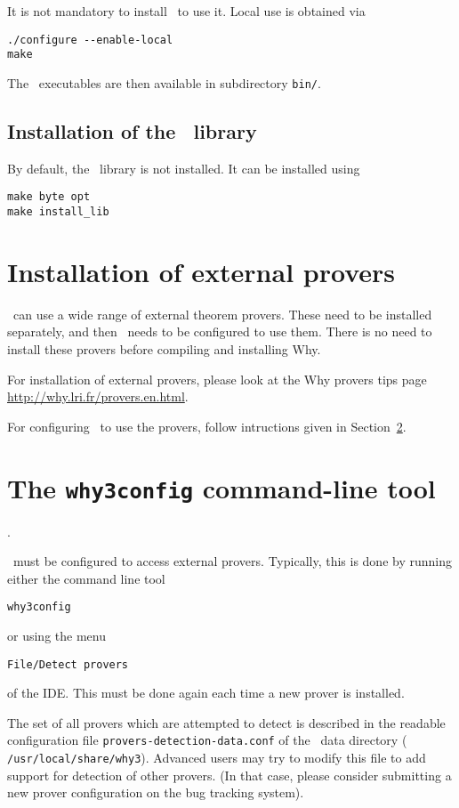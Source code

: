 It is not mandatory to install \why\ to use it. Local use is obtained via
\begin{verbatim}
./configure --enable-local
make
\end{verbatim}
The \why\ executables are then available in subdirectory \texttt{bin/}.

\subsection{Installation of the \why\ library}
\label{sec:installlib}

By default, the \why\ library is not installed. It can be installed using
\begin{verbatim}
make byte opt
make install_lib
\end{verbatim}

\section{Installation of external provers}

\why\ can use a wide range of external theorem provers. These need to
be installed separately, and then \why\ needs to be configured to use
them. There is no need to install these provers before compiling and
installing Why. 

For installation of external provers, please look at the Why provers
tips page \url{http://why.lri.fr/provers.en.html}.

For configuring \why\ to use the provers, follow intructions given in
Section~\ref{sec:why3config}.

\section{The \texttt{why3config} command-line tool}
\label{sec:why3config}.

\why\ must be configured to access external provers. Typically, this is done
by running either the command line tool
\begin{verbatim}
why3config
\end{verbatim}
or using the menu
\begin{verbatim}
File/Detect provers
\end{verbatim}
of the IDE. This must be done again each time a new prover is installed.

The set of all provers which are attempted to detect is described in
the readable configuration file \texttt{provers-detection-data.conf}
of the \why\ data directory (\eg{}
\texttt{/usr/local/share/why3}). Advanced users may try to modify this
file to add support for detection of other provers. (In that case,
please consider submitting a new prover configuration on the bug
tracking system).

